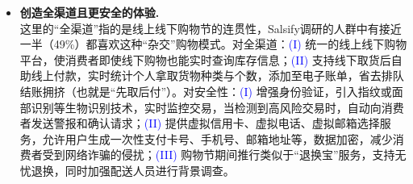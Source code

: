 \documentclass[12pt]{ctexart}
\begin{document}
\begin{itemize}
    \item \textbf{创造全渠道且更安全的体验.} \\
    这里的“全渠道”指的是线上线下购物节的连贯性，Salsify调研的人群中有接近一半（49\%）都喜欢这种“杂交”购物模式\cite{32}。对全渠道：\textcolor{blue}{(I)} 统一的线上线下购物平台，使消费者即使线下购物也能实时查询库存信息；\textcolor{blue}{(II)} 支持线下取货后自助线上付款，实时统计个人拿取货物种类与个数，添加至电子账单，省去排队结账拥挤（也就是“先取后付”）。对安全性：\textcolor{blue}{(I)} 增强身份验证，引入指纹或面部识别等生物识别技术，实时监控交易，当检测到高风险交易时，自动向消费者发送警报和确认请求；\textcolor{blue}{(II)} 提供虚拟信用卡、虚拟电话、虚拟邮箱选择服务，允许用户生成一次性支付卡号、手机号、邮箱地址等，数据加密，减少消费者受到网络诈骗的侵扰；\textcolor{blue}{(III)} 购物节期间推行类似于“退换宝”服务，支持无忧退换，同时加强配送人员进行背景调查。
\end{itemize}
\end{document}
